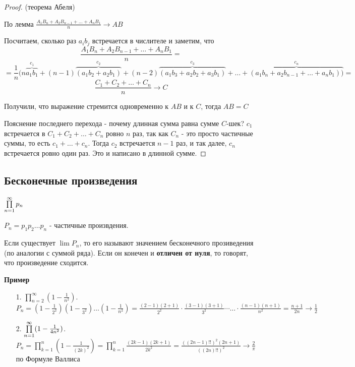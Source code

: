 \begin{proof} (теорема Абеля)
     
    По лемма $\frac{A_1B_n + A_2B_{n-1} + \ldots + A_nB_1}{n} \to AB$

    Посчитаем, сколько раз $a_ib_j$ встречается в числителе и заметим, что 
    \begin{equation*}
        \frac{A_1B_n + A_2B_{n-1} + \ldots + A_nB_1}{n} = 
    \end{equation*}
    \begin{equation*}
        = \frac{1}{n}(n\overbrace{a_1b_1}^{c_1} 
        + (n-1)\overbrace{(a_1b_2 + a_2b_1)}^{c_2} 
        + (n-2)\overbrace{(a_1b_3+a_2b_2+a_3b_1)}^{c_3} + \ldots 
        + \overbrace{(a_1b_n + a_2b_{n-1} + \ldots + a_nb_1))}^{c_n} =
    \end{equation*}
    \begin{equation*}
        \frac{C_1 + C_2 + \ldots + C_n}{n} \to C
    \end{equation*}

    Получили, что выражение стремится одновременно к $AB$ и к $C$, тогда $AB = C$

    Пояснение последнего перехода - почему длинная сумма равна сумме $C$-шек? 
    $c_1$ встречается в $C_1 + C_2 + \ldots + C_n$ ровно $n$ раз, так как $C_n$ - это просто 
    частичные суммы, то есть $c_1 + \ldots + c_n$. Тогда $c_2$ встречается $n-1$ раз, и так далее, $c_n$ встречается ровно один раз.
     Это и написано в длинной сумме.


\end{proof}

\subsection{Бесконечные произведения}

\begin{conj}
    $\prod \limits_{n=1}^\infty p_n$

    $P_n = p_1p_2 \ldots p_n$ - частичные произвдения.

    Если существует $\lim P_n$, то его называют значением бесконечного прозиведения (по аналогии с суммой ряда).
    Если он конечен и \textbf{отличен от нуля}, то говорят, что произведение сходится.
\end{conj}

\textbf{Пример}
\begin{enumerate}
    \item[1.] $\prod \limits_{n=2}^\infty (1 - \frac{1}{n^2})$.
    $P_n = (1 - \frac{1}{2^2})(1-\frac{}{3^2})\ldots (1-\frac{1}{n^2}) = 
    \frac{(2-1)(2+1)}{2^2}
    \cdot \frac{(3-1)(3+1)}{3^2} 
    \cdots \ldots \cdot \frac{(n-1)(n+1)}{n^2}
    = \frac{n+1}{2n} \to \frac{1}{2}$
    \item[2.] $\prod \limits_{n=1}^\infty (1 - \frac{1}{4n^2})$.
    $P_n = \prod \limits_{k=1}^n (1 - \frac{1}{(2k)^2}) = \prod \limits_{k=1}^n \frac{(2k-1)(2k+1)}{2k^2} = \frac{((2n-1)!!)^2(2n+1)}{((2n)!!)^2} \to \frac{2}{\pi}$ по Формуле Валлиса
\end{enumerate}


